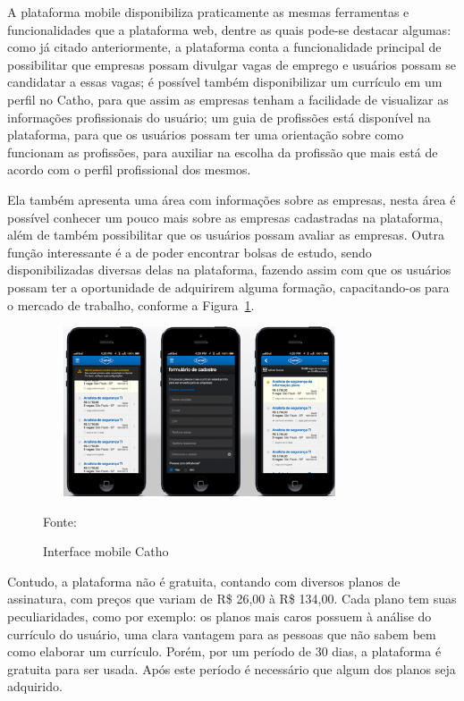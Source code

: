 A plataforma mobile disponibiliza praticamente as mesmas ferramentas e funcionalidades que a plataforma web, dentre as quais pode-se destacar algumas: como já citado anteriormente, a plataforma conta a funcionalidade principal de possibilitar que empresas possam divulgar vagas de emprego e usuários possam se candidatar a essas vagas; é possível também disponibilizar um currículo em um perfil no Catho, para que assim as empresas tenham a facilidade de visualizar as informações profissionais do usuário; um guia de profissões está disponível na plataforma, para que os usuários possam ter uma orientação sobre como funcionam as profissões, para auxiliar na escolha da profissão que mais está de acordo com o perfil profissional dos mesmos.

Ela também apresenta uma área com informações sobre as empresas, nesta área é possível conhecer um pouco mais sobre as empresas cadastradas na plataforma, além de também possibilitar que os usuários possam avaliar as empresas. Outra função interessante é a de poder encontrar bolsas de estudo, sendo disponibilizadas diversas delas na plataforma, fazendo assim com que os usuários possam ter a oportunidade de adquirirem alguma formação, capacitando-os para o mercado de trabalho, conforme a Figura~\hypersetup{linkcolor=black}\ref{fig:Interface}.


\begin{figure}[!h]
	\centering
		
	\caption{Interface mobile Catho}
	\includegraphics[width=350px, height=190px]{./images/cathoMobile.png}
		\label{fig:Interface}
	\par {Fonte: \cite{catho}}
\end{figure}

Contudo, a plataforma não é gratuita, contando com diversos planos de assinatura, com preços que variam de R\$ 26,00 à R\$ 134,00. Cada plano tem suas peculiaridades, como por exemplo: os planos mais caros possuem à análise do currículo do usuário, uma clara vantagem para as pessoas que não sabem bem como elaborar um currículo. Porém, por um período de 30 dias, a plataforma é gratuita para ser usada. Após este período é necessário que algum dos planos seja adquirido.

